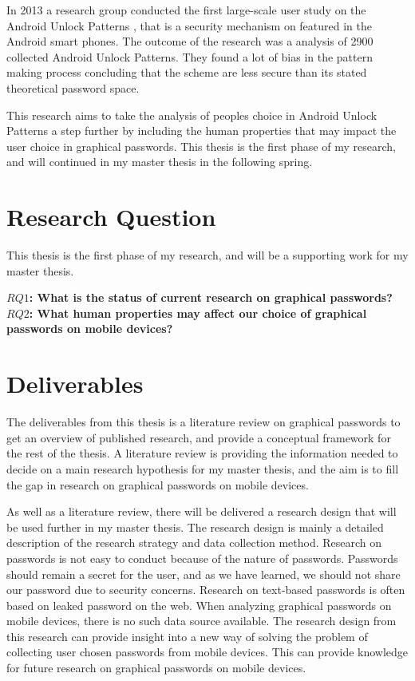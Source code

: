   In 2013 a research group conducted the first large-scale user study on the Android Unlock Patterns \cite{Uellenbeck}, that is a security mechanism on featured in the Android smart phones. The outcome of the research was a analysis of 2900 collected Android Unlock Patterns. They found a lot of bias in the pattern making process concluding that the scheme are less secure than its stated theoretical password space. 

  This research aims to take the analysis of peoples choice in Android Unlock Patterns a step further by including the human properties that may impact the user choice in graphical passwords. This thesis is the first phase of my research, and will continued in my master thesis in the following spring. 

  \section{Research Question}
    
    This thesis is the first phase of my research, and will be a supporting work for my master thesis. 

    {\bf $RQ1$: What is the status of current research on graphical passwords?} \\

    {\bf $RQ2$: What human properties may affect our choice of graphical passwords on mobile devices?}

  \section{Deliverables}

    The deliverables from this thesis is a literature review on graphical passwords to get an overview of published research, and provide a conceptual framework for the rest of the thesis. A literature review is providing the information needed to decide on a main research hypothesis for my master thesis, and the aim is to fill the gap in research on graphical passwords on mobile devices.

    As well as a literature review, there will be delivered a research design that will be used further in my master thesis. The research design is mainly a detailed description of the research strategy and data collection method. Research on passwords is not easy to conduct because of the nature of passwords. Passwords should remain a secret for the user, and as we have learned, we should not share our password due to security concerns. Research on text-based passwords is often based on leaked password on the web. When analyzing graphical passwords on mobile devices, there is no such data source available. 
    The research design from this research can provide insight into a new way of solving the problem of collecting user chosen passwords from mobile devices. This can provide knowledge for future research on graphical passwords on mobile devices.


